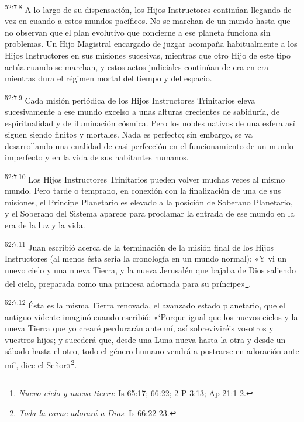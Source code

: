 \par
\textsuperscript{52:7.8} A lo largo de su dispensación, los Hijos Instructores continúan llegando de vez en cuando a estos mundos pacíficos. No se marchan de un mundo hasta que no observan que el plan evolutivo que concierne a ese planeta funciona sin problemas. Un Hijo Magistral encargado de juzgar acompaña habitualmente a los Hijos Instructores en sus misiones sucesivas, mientras que otro Hijo de este tipo actúa cuando se marchan, y estos actos judiciales continúan de era en era mientras dura el régimen mortal del tiempo y del espacio.

\par
\textsuperscript{52:7.9} Cada misión periódica de los Hijos Instructores Trinitarios eleva sucesivamente a ese mundo excelso a unas alturas crecientes de sabiduría, de espiritualidad y de iluminación cósmica. Pero los nobles nativos de una esfera así siguen siendo finitos y mortales. Nada es perfecto; sin embargo, se va desarrollando una cualidad de casi perfección en el funcionamiento de un mundo imperfecto y en la vida de sus habitantes humanos.

\par
\textsuperscript{52:7.10} Los Hijos Instructores Trinitarios pueden volver muchas veces al mismo mundo. Pero tarde o temprano, en conexión con la finalización de una de sus misiones, el Príncipe Planetario es elevado a la posición de Soberano Planetario, y el Soberano del Sistema aparece para proclamar la entrada de ese mundo en la era de la luz y la vida.

\par
\textsuperscript{52:7.11} Juan escribió acerca de la terminación de la misión final de los Hijos Instructores (al menos ésta sería la cronología en un mundo normal): «Y vi un nuevo cielo y una nueva Tierra, y la nueva Jerusalén que bajaba de Dios saliendo del cielo, preparada como una princesa adornada para su príncipe»\footnote{\textit{Nuevo cielo y nueva tierra}: Is 65:17; 66:22; 2 P 3:13; Ap 21:1-2.}.

\par
\textsuperscript{52:7.12} Ésta es la misma Tierra renovada, el avanzado estado planetario, que el antiguo vidente imaginó cuando escribió: «`Porque igual que los nuevos cielos y la nueva Tierra que yo crearé perdurarán ante mí, así sobreviviréis vosotros y vuestros hijos; y sucederá que, desde una Luna nueva hasta la otra y desde un sábado hasta el otro, todo el género humano vendrá a postrarse en adoración ante mí', dice el Señor»\footnote{\textit{Toda la carne adorará a Dios}: Is 66:22-23.}.

